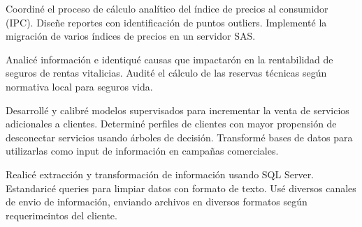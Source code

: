 \documentclass[10pt,a4paper,ragged2e,withhyper,academicons]{altacv}
\begin{document}
\begin{paracol}{2}


{\justify Coordin\'e el proceso de c\'alculo anal\'itico del \'indice de precios al consumidor (IPC). Dise\~ne reportes con
identificación de puntos outliers. Implement\'e la migraci\'on de varios \'indices de precios en un servidor SAS.}\\
{}

\divider
\smallskip



{\justify Analic\'e informaci\'on e identiqu\'e causas que impactar\'on en la rentabilidad de seguros de rentas vitalicias. 
Audit\'e el c\'alculo de las reservas t\'ecnicas seg\'un normativa local para seguros vida.}\\
{}

\divider
\newpage


{\justify Desarroll\'e y calibr\'e modelos supervisados para incrementar la venta de servicios adicionales a clientes.
Determin\'e perfiles de clientes con mayor propensi\'on de desconectar servicios usando \'arboles de decisi\'on.
Transform\'e bases de datos para utilizarlas como input de informaci\'on en campa\~nas comerciales.}\\
{}

\divider
\smallskip
 

{\justify Realic\'e extracci\'on y transformaci\'on de informaci\'on usando SQL Server. 
 Estandaric\'e queries para limpiar datos con formato de texto. 
 Us\'e diversos canales de envio de informaci\'on, enviando archivos en diversos formatos seg\'un requerimeintos del cliente.}\\  
{}


\end{paracol}
\end{document}
